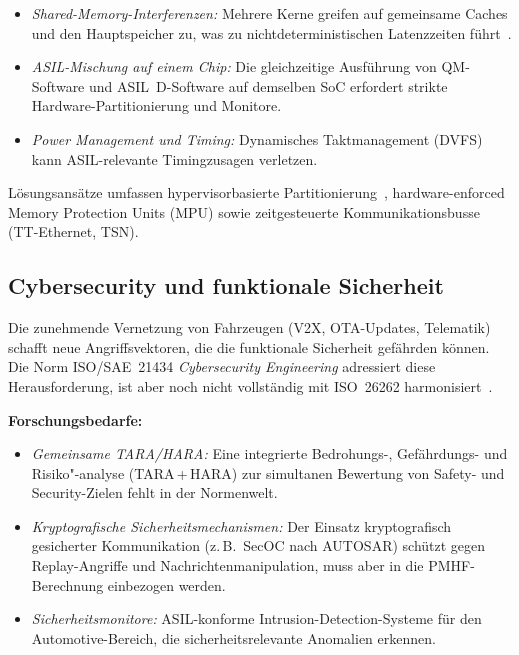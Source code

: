 ﻿\documentclass[a4paper,12pt]{article}
\theoremstyle{definition}
\begin{document}
\begin{itemize}
  \item \emph{Shared-Memory-Interferenzen:} Mehrere Kerne greifen
        auf gemeinsame Caches und den Hauptspeicher zu, was zu
        nichtdeterministischen Latenzzeiten führt~\cite{jmc_2018}.
  \item \emph{ASIL-Mischung auf einem Chip:} Die gleichzeitige
        Ausführung von QM-Software und ASIL~D-Software auf demselben
        SoC erfordert strikte Hardware-Partitionierung und Monitore.
  \item \emph{Power Management und Timing:}
        Dynamisches Taktmanagement (DVFS) kann ASIL-relevante
        Timingzusagen verletzen.
\end{itemize}

Lösungsansätze umfassen hypervisorbasierte Partitionierung~\cite{heiser_2020},
hardware-enforced Memory Protection Units (MPU) sowie
zeitgesteuerte Kommunikationsbusse (TT-Ethernet, TSN).

\subsection{Cybersecurity und funktionale Sicherheit}

Die zunehmende Vernetzung von Fahrzeugen (V2X, OTA-Updates,
Telematik) schafft neue Angriffsvektoren, die die funktionale
Sicherheit gefährden können. Die Norm ISO/SAE~21434
\emph{Cybersecurity Engineering} adressiert diese Herausforderung,
ist aber noch nicht vollständig mit ISO~26262 harmonisiert~\cite{iso21434_2021}.

\textbf{Forschungsbedarfe:}
\begin{itemize}
  \item \emph{Gemeinsame TARA/HARA:}
        Eine integrierte Bedrohungs-, Gefährdungs- und Risiko"-analyse
        (TARA\,+\,HARA) zur simultanen Bewertung von Safety- und
        Security-Zielen fehlt in der Normenwelt.
  \item \emph{Kryptografische Sicherheitsmechanismen:}
        Der Einsatz kryptografisch gesicherter Kommunikation
        (z.\,B.\ SecOC nach AUTOSAR) schützt gegen Replay-Angriffe
        und Nachrichtenmanipulation, muss aber in die
        PMHF-Berechnung einbezogen werden.
  \item \emph{Sicherheitsmonitore:}
        ASIL-konforme Intrusion-Detection-Systeme für den
        Automotive-Bereich, die sicherheitsrelevante Anomalien
        erkennen.
\end{itemize}
\end{document}
